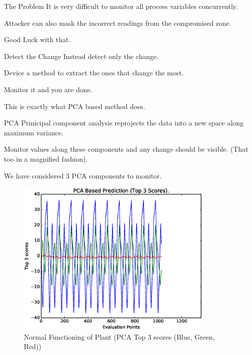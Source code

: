 \documentclass[10pt]{beamer}
\begin{document}
\begin{frame}{The Problem}
	It is very difficult to monitor all process variables concurrently. 
    
    Attacker can also mask the incorrect readings from the compromised zone.
    
    Good Luck with that.
\end{frame}

\begin{frame}{Detect the Change}
	Instead detect only the change. 
    
    Device a method to extract the ones that change the most.
    
    Monitor it and you are done.
    
    This is exactly what PCA based method does.
\end{frame}

\begin{frame}{PCA}
	Prinicipal component analysis reprojects the data into a new space along maximum variance.
    
    Monitor values along these components and any change should be visible. (That too in a magnified fashion).
    
    We have considered 3 PCA components to monitor.
\end{frame}

\begin{frame}
  \begin{figure}
    \centering
    \includegraphics[width=0.85\textwidth]{Normal_Functioning_PCA.eps}
    \caption{\label{fig:NFP}Normal Functioning of Plant (PCA Top 3 scores (Blue, Green, Red))}
  \end{figure}
\end{frame}
\end{document}
